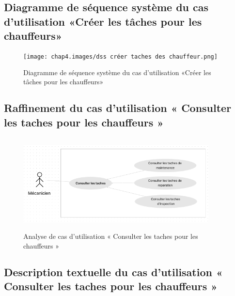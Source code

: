 \newpage
\subsection{Diagramme de séquence système du cas d’utilisation «Créer les tâches pour les chauffeurs»}

\begin{figure}[ht!]
  \centering
  \texttt{[image: chap4.images/dss créer taches des chauffeur.png]}
  \caption{ Diagramme de séquence système du cas d’utilisation «Créer les tâches pour les chauffeurs» }
\end{figure}


\newpage
\subsection{Raffinement du cas d'utilisation « Consulter les taches pour les chauffeurs »}

\begin{figure}[h!]
  \centering
  \includegraphics[width=0.9\textwidth,height=5cm]{chap4.images/raf consulter chauf.png}
  \caption{Analyse de cas d’utilisation « Consulter les taches pour les chauffeurs »}

\end{figure}

\subsection{Description textuelle du cas d’utilisation « Consulter les taches pour les chauffeurs »}

